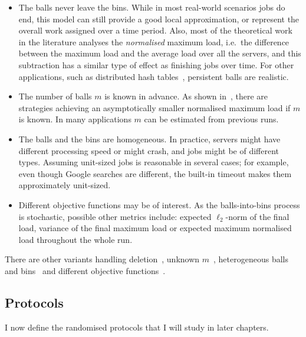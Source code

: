 \begin{itemize}
    \item
    The balls never leave the bins. While in most real-world scenarios jobs do end, this model can still provide a good local approximation, or represent the overall work assigned over a time period. Also, most of the theoretical work in the literature analyses the \textit{normalised} maximum load, i.e.\ the difference between the maximum load and the average load over all the servers, and this subtraction has a similar type of effect as finishing jobs over time. For other applications, such as distributed hash tables~\cite{wieder2017ballsintobinslandscape}, persistent balls are realistic. 
    \item
    The number of balls $m$ is known in advance. As shown in~\cite{feldheim2021longtermthinning}, there are strategies achieving an asymptotically smaller normalised maximum load if $m$ is known. In many applications $m$ can be estimated from previous runs.
    \item
    The balls and the bins are homogeneous. In practice, servers might have different processing speed or might crash, and jobs might be of different types. Assuming unit-sized jobs is reasonable in several cases; for example, even though Google searches are different, the built-in timeout makes them approximately unit-sized.
    \item
    Different objective functions may be of interest. As the balls-into-bins process is stochastic, possible other metrics include: expected $\ell_2$-norm of the final load, variance of the final maximum load or expected maximum normalised load throughout the whole run.
\end{itemize}


There are other variants handling deletion~\cite{azar1999twochoice}, unknown $m$~\cite{feldheim2021longtermthinning}, heterogeneous balls and bins~\cite{berenbrink2008weighted} and different objective functions~\cite{feldheim2021longtermthinning}.


\subsection{Protocols} \label{protocols}

I now define the randomised protocols that I will study in later chapters.


\paragraph{\OneChoice}

